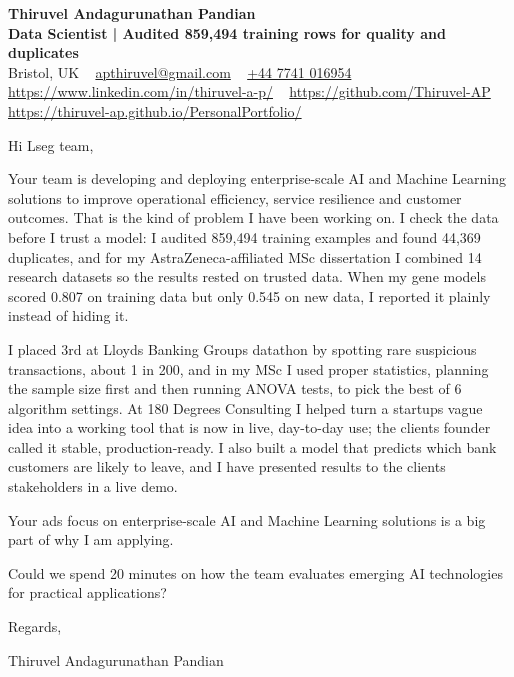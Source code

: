 \documentclass[11pt,a4paper]{article}
\newcommand{\num}[1]{\textbf{#1}}   %
\begin{document}
\raggedright
\pagestyle{empty}

\begin{center}
    {\LARGE \color{linkblue} \textbf{Thiruvel Andagurunathan Pandian}}\\[0.2cm]
    {\color{headernavy}\small\textbf{Data Scientist | Audited \num{859,494} training rows for quality and duplicates}}\\[0.2cm]
    {\small Bristol, UK\nobreak\ \,\textbar\, \href{mailto:apthiruvel@gmail.com}{apthiruvel@gmail.com}\nobreak\ \,\textbar\, \href{tel:+447741016954}{+44 7741 016954}\nobreak\ \,\textbar\, \href{https://www.linkedin.com/in/thiruvel-a-p/}{https://www.linkedin.com/in/thiruvel-a-p/}\nobreak\ \,\textbar\, \href{https://github.com/Thiruvel-AP}{https://github.com/Thiruvel-AP}\nobreak\ \,\textbar\, \href{https://thiruvel-ap.github.io/PersonalPortfolio/}{https://thiruvel-ap.github.io/PersonalPortfolio/}}

\end{center}

\vspace{0.4cm}

\noindent
Hi Lseg team,

Your team is developing and deploying enterprise-scale AI and Machine Learning solutions to improve operational efficiency, service resilience and customer outcomes. That is the kind of problem I have been working on. I check the data before I trust a model: I audited 859,494 training examples and found 44,369 duplicates, and for my AstraZeneca-affiliated MSc dissertation I combined 14 research datasets so the results rested on trusted data. When my gene models scored 0.807 on training data but only 0.545 on new data, I reported it plainly instead of hiding it.

I placed 3rd at Lloyd\textquotesingle{}s Banking Group\textquotesingle{}s datathon by spotting rare suspicious transactions, about 1 in 200, and in my MSc I used proper statistics, planning the sample size first and then running ANOVA tests, to pick the best of 6 algorithm settings. At 180 Degrees Consulting I helped turn a startup\textquotesingle{}s vague idea into a working tool that is now in live, day-to-day use; the client\textquotesingle{}s founder called it \textquotedbl{}stable, production-ready\textquotedbl{}. I also built a model that predicts which bank customers are likely to leave, and I have presented results to the client\textquotesingle{}s stakeholders in a live demo.

Your ad\textquotesingle{}s focus on enterprise-scale AI and Machine Learning solutions is a big part of why I am applying.

Could we spend 20 minutes on how the team evaluates emerging AI technologies for practical applications?

\vspace{0.5cm}

Regards,

Thiruvel Andagurunathan Pandian
\end{document}
